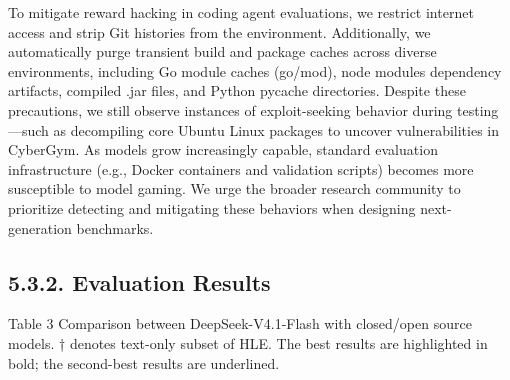 \documentclass[
  10
]{article}
\begin{document}
To mitigate reward hacking in coding agent evaluations, we restrict
internet access and strip Git histories from the environment.
Additionally, we automatically purge transient build and package caches
across diverse environments, including Go module caches (go/mod), node
modules dependency artifacts, compiled .jar files, and Python pycache
directories. Despite these precautions, we still observe instances of
exploit-seeking behavior during testing---such as decompiling core
Ubuntu Linux packages to uncover vulnerabilities in CyberGym. As models
grow increasingly capable, standard evaluation infrastructure (e.g.,
Docker containers and validation scripts) becomes more susceptible to
model gaming. We urge the broader research community to prioritize
detecting and mitigating these behaviors when designing next-generation
benchmarks.

\subsection{5.3.2. Evaluation Results}\label{evaluation-results-1}

Table 3 \textbar{} Comparison between DeepSeek-V4.1-Flash with
closed/open source models. † denotes text-only subset of HLE. The best
results are highlighted in bold; the second-best results are underlined.
\end{document}
